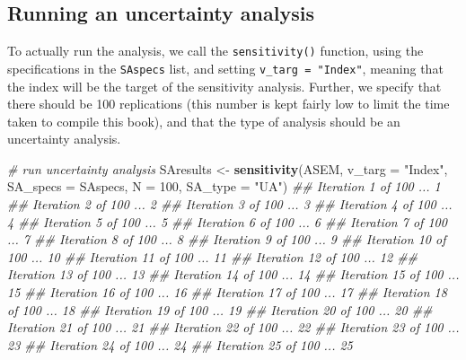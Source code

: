 \documentclass[
]{book}
\newenvironment{Shaded}{\begin{snugshade}}{\end{snugshade}}
\newcommand{\CommentTok}[1]{\textcolor[rgb]{0.56,0.35,0.01}{\textit{#1}}}
\newcommand{\DataTypeTok}[1]{\textcolor[rgb]{0.13,0.29,0.53}{#1}}
\newcommand{\DecValTok}[1]{\textcolor[rgb]{0.00,0.00,0.81}{#1}}
\newcommand{\KeywordTok}[1]{\textcolor[rgb]{0.13,0.29,0.53}{\textbf{#1}}}
\newcommand{\NormalTok}[1]{#1}
\newcommand{\StringTok}[1]{\textcolor[rgb]{0.31,0.60,0.02}{#1}}
\begin{document}
\hypertarget{running-an-uncertainty-analysis}{%
\subsection{Running an uncertainty analysis}\label{running-an-uncertainty-analysis}}

To actually run the analysis, we call the \texttt{sensitivity()} function, using the specifications in the \texttt{SAspecs} list, and setting \texttt{v\_targ\ =\ "Index"}, meaning that the index will be the target of the sensitivity analysis. Further, we specify that there should be 100 replications (this number is kept fairly low to limit the time taken to compile this book), and that the type of analysis should be an uncertainty analysis.

\begin{Shaded}
\begin{Highlighting}[]
\CommentTok{# run uncertainty analysis}
\NormalTok{SAresults <-}\StringTok{ }\KeywordTok{sensitivity}\NormalTok{(ASEM, }\DataTypeTok{v_targ =} \StringTok{"Index"}\NormalTok{,}
                         \DataTypeTok{SA_specs =}\NormalTok{ SAspecs,}
                         \DataTypeTok{N =} \DecValTok{100}\NormalTok{,}
                         \DataTypeTok{SA_type =} \StringTok{"UA"}\NormalTok{)}
\CommentTok{## Iteration 1 of 100 ... 1%
\CommentTok{## Iteration 2 of 100 ... 2%
\CommentTok{## Iteration 3 of 100 ... 3%
\CommentTok{## Iteration 4 of 100 ... 4%
\CommentTok{## Iteration 5 of 100 ... 5%
\CommentTok{## Iteration 6 of 100 ... 6%
\CommentTok{## Iteration 7 of 100 ... 7%
\CommentTok{## Iteration 8 of 100 ... 8%
\CommentTok{## Iteration 9 of 100 ... 9%
\CommentTok{## Iteration 10 of 100 ... 10%
\CommentTok{## Iteration 11 of 100 ... 11%
\CommentTok{## Iteration 12 of 100 ... 12%
\CommentTok{## Iteration 13 of 100 ... 13%
\CommentTok{## Iteration 14 of 100 ... 14%
\CommentTok{## Iteration 15 of 100 ... 15%
\CommentTok{## Iteration 16 of 100 ... 16%
\CommentTok{## Iteration 17 of 100 ... 17%
\CommentTok{## Iteration 18 of 100 ... 18%
\CommentTok{## Iteration 19 of 100 ... 19%
\CommentTok{## Iteration 20 of 100 ... 20%
\CommentTok{## Iteration 21 of 100 ... 21%
\CommentTok{## Iteration 22 of 100 ... 22%
\CommentTok{## Iteration 23 of 100 ... 23%
\CommentTok{## Iteration 24 of 100 ... 24%
\CommentTok{## Iteration 25 of 100 ... 25%
}}}}}}}}}}}}}}}}}}}}}}}}}
\end{Highlighting}
\end{Shaded}
\end{document}
